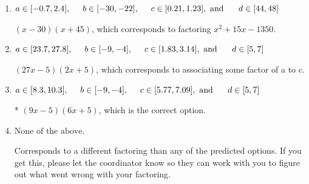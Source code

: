 \documentclass{extbook}[14pt]
\begin{document}
\begin{enumerate}
{\begin{enumerate}[label=\Alph*.]
 $(3x -5)(18x + 5)$, which corresponds to associating some factor of c to a.
\item \( a \in [-0.7, 2.4], \hspace*{5mm} b \in [-30, -22], \hspace*{5mm} c \in [0.21, 1.23], \text{ and } \hspace*{5mm} d \in [44, 48] \)

 $(x -30)(x + 45)$, which corresponds to factoring $x^{2} +15 x -1350$.
\item \( a \in [23.7, 27.8], \hspace*{5mm} b \in [-9, -4], \hspace*{5mm} c \in [1.83, 3.14], \text{ and } \hspace*{5mm} d \in [5, 7] \)

 $(27x -5)(2x + 5)$, which corresponds to associating some factor of a to c.
\item \( a \in [8.3, 10.3], \hspace*{5mm} b \in [-9, -4], \hspace*{5mm} c \in [5.77, 7.09], \text{ and } \hspace*{5mm} d \in [5, 7] \)

* $(9x -5)(6x + 5)$, which is the correct option.
\item \( \text{None of the above.} \)

 Corresponds to a different factoring than any of the predicted options. If you get this, please let the coordinator know so they can work with you to figure out what went wrong with your factoring.
\end{enumerate}

}
\end{enumerate}
\end{document}
